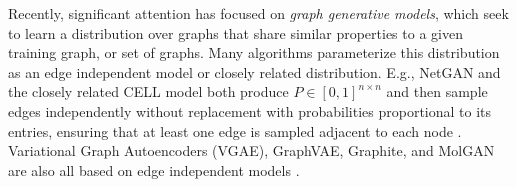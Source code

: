 \documentclass{article}
\newcommand{\todo}[1]{\textcolor{blue}{TODO: #1}}
\begin{document}
Recently, significant attention has focused on \emph{graph generative models}, which seek to learn a distribution over graphs that share similar properties to a given training graph, or set of graphs. Many algorithms parameterize this distribution as an edge independent model or closely related distribution. %
E.g., NetGAN and the closely related CELL model both produce $P \in [0,1]^{n \times n}$ and then sample edges independently without replacement with probabilities proportional to its entries, ensuring that at least one edge is sampled adjacent to each node \cite{bojchevski2018netgan,rendsburgnetgan}.
Variational Graph Autoencoders (VGAE), GraphVAE, Graphite, and MolGAN are also all based on edge independent models \cite{KipfWelling:2016,SimonovskyKomodakis:2018,De-CaoKipf:2018,GroverZweigErmon:2019}. 
\end{document}
